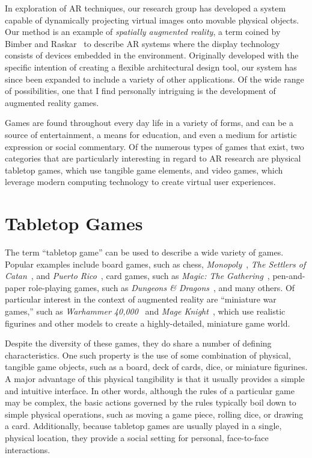 \documentclass{thesis}
\begin{document}
In exploration of AR techniques, our research group has developed a system capable of dynamically projecting virtual images onto movable physical objects. Our method is an example of \emph{spatially  augmented reality}, a term coined by Bimber and Raskar~\cite{BimberBook} to describe AR systems where the display technology consists of devices embedded in the environment. Originally developed with the specific intention of creating a flexible architectural design tool, our system has since been expanded to include a variety of other applications. Of the wide range of possibilities, one that I find personally intriguing is the development of augmented reality games.

Games are found throughout every day life in a variety of forms, and can be a source of entertainment, a means for education, and even a medium for artistic expression or social commentary. Of the numerous types of games that exist, two categories that are particularly interesting in regard to AR research are physical tabletop games, which use tangible game elements, and video games, which leverage modern computing technology to create virtual user experiences.

\section{Tabletop Games}

The term ``tabletop game'' can be used to describe a wide variety of games. Popular examples include board games, such as chess, \emph{Monopoly}~\cite{Monopoly}, \emph{The Settlers of Catan}~\cite{Catan}, and \emph{Puerto Rico}~\cite{PuertoRico}, card games, such as \emph{Magic: The Gathering}~\cite{MTG}, pen-and-paper role-playing games, such as \emph{Dungeons \& Dragons}~\cite{D&D}, and many others. Of particular interest in the context of augmented reality are ``miniature war games,'' such as \emph{Warhammer 40,000}~\cite{Warhammer40k} and \emph{Mage Knight}~\cite{MageKnight}, which use realistic figurines and other models to create a highly-detailed, miniature game world.

Despite the diversity of these games, they do share a number of defining characteristics. One such property is the use of some combination of physical, tangible game objects, such as a board, deck of cards, dice, or miniature figurines. A major advantage of this physical tangibility is that it usually provides a simple and intuitive interface. In other words, although the rules of a particular game may be complex, the basic actions governed by the rules typically boil down to simple physical operations, such as moving a game piece, rolling dice, or drawing a card. Additionally, because tabletop games are usually played in a single, physical location, they provide a social setting for personal, face-to-face interactions.
\end{document}
